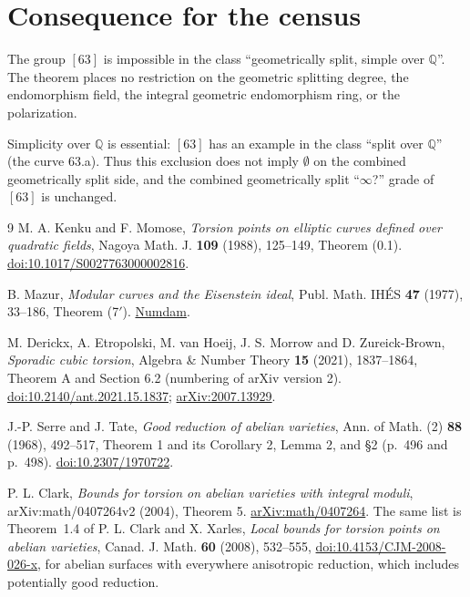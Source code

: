 \documentclass[11pt]{article}
\newcommand{\Q}{\mathbb Q}
\begin{document}
\section{Consequence for the census}

The group
\href{https://genus-2-torsion.github.io/group.html?g=63}{\([63]\)} is
impossible in the class ``geometrically split, simple over \(\Q\)''. The
theorem places no restriction on the geometric splitting degree, the
endomorphism field, the integral geometric endomorphism ring, or the
polarization.

Simplicity over \(\Q\) is essential: \([63]\) has an example in the class
``split over \(\Q\)'' (the curve 63.a). Thus this exclusion does not
imply \(\emptyset\) on the combined geometrically split side, and the
combined geometrically split ``\(\infty\)?'' grade of \([63]\) is
unchanged.

\begin{thebibliography}{9}
M. A. Kenku and F. Momose,
\emph{Torsion points on elliptic curves defined over quadratic fields},
Nagoya Math. J. \textbf{109} (1988), 125--149, Theorem (0.1).
\href{https://doi.org/10.1017/S0027763000002816}{doi:10.1017/S0027763000002816}.

B. Mazur,
\emph{Modular curves and the Eisenstein ideal},
Publ. Math. IH\'ES \textbf{47} (1977), 33--186, Theorem (7\('\)).
\href{https://www.numdam.org/item/PMIHES_1977__47__33_0/}{Numdam}.

M. Derickx, A. Etropolski, M. van Hoeij, J. S. Morrow and
D. Zureick-Brown,
\emph{Sporadic cubic torsion},
Algebra \& Number Theory \textbf{15} (2021), 1837--1864, Theorem A and
Section 6.2 (numbering of arXiv version 2).
\href{https://doi.org/10.2140/ant.2021.15.1837}{doi:10.2140/ant.2021.15.1837};
\href{https://arxiv.org/abs/2007.13929}{arXiv:2007.13929}.

J.-P. Serre and J. Tate,
\emph{Good reduction of abelian varieties},
Ann. of Math. (2) \textbf{88} (1968), 492--517, Theorem 1 and its
Corollary 2, Lemma 2, and \S2 (p.~496 and p.~498).
\href{https://doi.org/10.2307/1970722}{doi:10.2307/1970722}.

P. L. Clark,
\emph{Bounds for torsion on abelian varieties with integral moduli},
arXiv:math/0407264v2 (2004), Theorem 5.
\href{https://arxiv.org/pdf/math/0407264}{arXiv:math/0407264}.
The same list is Theorem~1.4 of P. L. Clark and X. Xarles, \emph{Local bounds for torsion points on abelian varieties}, Canad. J. Math. \textbf{60} (2008), 532--555, \href{https://doi.org/10.4153/CJM-2008-026-x}{doi:10.4153/CJM-2008-026-x}, for abelian surfaces with everywhere anisotropic reduction, which includes potentially good reduction.
\end{thebibliography}
\end{document}
